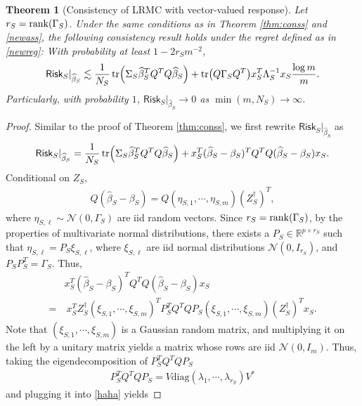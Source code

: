 \documentclass[a4paper,11pt]{article}
\numberwithin{equation}{section}
\theoremstyle{plain}
\newtheorem{Th}{Theorem}[section]
\theoremstyle{definition}
\def\R{{\mathbb R}}
\def\R{{\mathbb R}}
\def\risk{{\textsf{Risk}}}
\begin{document}
\begin{Th}[Consistency of LRMC with vector-valued response]\label{thm:consv}
Let $ r_S = \rank(\Gamma_S)$.
Under the same conditions as in Theorem \ref{thm:conss} and \eqref{newass},
the following consistency result holds under the regret defined as in \eqref{newreg}: With probability at least $1-2r_Sm^{-2}$,
\begin{align}
\risk_S|_{\widehat{\beta}_S} \lesssim \frac{1}{N_S}\tr(\Sigma_S\widehat{\beta}_S^TQ^TQ\widehat{\beta}_S) + \tr(Q\Gamma_SQ^T)x_S^T\Lambda_S^{-1}x_S\frac{\log m}{m}.\label{sddd}
\end{align}
Particularly, with probability $1$, $\risk_S|_{\widehat{\beta}_S}\to 0$ as $\min(m, N_S)\to\infty$.
\end{Th}
\begin{proof}
Similar to the proof of Theorem \ref{thm:conss}, we first rewrite $\risk_S|_{\widehat{\beta}_S}$ as 
\begin{align}
\risk_S|_{\widehat{\beta}_S} = \frac{1}{N_S}\tr(\Sigma_S\widehat{\beta}_S^TQ^TQ\widehat{\beta}_S) + x_S^T(\widehat{\beta}_S-\beta_S)^TQ^TQ(\widehat{\beta}_S-\beta_S)x_S.\label{002}
\end{align}
Conditional on $Z_S$,
\begin{align}
Q(\widehat{\beta}_S-\beta_S) = Q(\eta_{S,1}, \cdots, \eta_{S, m})(Z_S^\dagger)^T,
\end{align}
where $\eta_{S,\ell}\sim\mathcal N(0,\Gamma_S)$ are iid random vectors. 
Since $r_S = \rank(\Gamma_S)$, by the properties of multivariate normal distributions, there exists a $P_S\in\R^{p\times r_S}$ such that $\eta_{S,\ell} = P_S\xi_{S, \ell}$, where $\xi_{S,\ell}$ are iid normal distributions $\mathcal N(0, I_{r_S})$, and $P_SP_S^T = \Gamma_S$. 
Thus, 
\begin{align}
&x_S^T(\widehat{\beta}_S-\beta_S)^TQ^TQ(\widehat{\beta}_S-\beta_S)x_S\nonumber\\
=&\  x_S^TZ_S^\dagger(\xi_{S,1}, \cdots, \xi_{S, m})^TP_S^TQ^TQP_S(\xi_{S,1}, \cdots, \xi_{S, m})(Z_S^\dagger)^Tx_S.\label{haha}
\end{align}
Note that $(\xi_{S,1}, \cdots, \xi_{S, m})$ is a Gaussian random matrix, and multiplying it on the left by a unitary matrix yields a matrix whose rows are iid $\mathcal N(0, I_m)$. 
Thus, taking the eigendecomposition of $P_S^TQ^TQP_S$
\begin{align*}
P_S^TQ^TQP_S = V\text{diag}(\lambda_1, \cdots, \lambda_{r_S})V^*
 \end{align*}
and plugging it into \eqref{haha} yields   

\end{proof}
\end{document}
